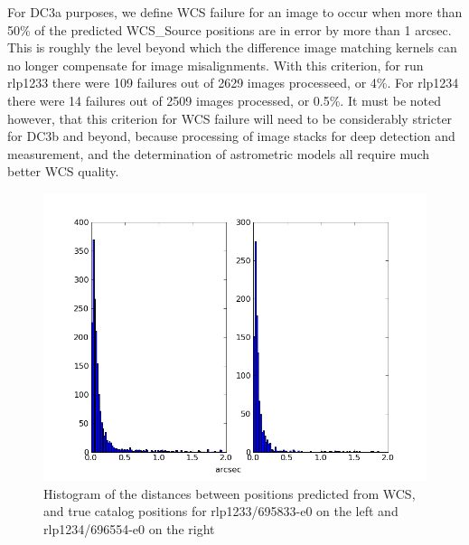For DC3a purposes, we define WCS failure for an image to occur when
more than 50\% of the predicted WCS\_Source positions are in error by
more than 1 arcsec.  This is roughly the level beyond which the difference
image matching kernels can no longer compensate for image misalignments. With
this criterion, for run rlp1233 there were 109 failures out of 2629
images processeed, or 4\%.   For rlp1234 there were 14 failures out
of 2509 images processed, or 0.5\%.  It must be noted however, that this criterion for WCS failure will
need to be considerably stricter for DC3b and beyond, because
processing of image stacks for deep detection and measurement, and the
determination of astrometric models all require much better WCS quality.
\begin{figure}[hb]
\begin{center}
\includegraphics{images/rlp1233_1234_match.png}
\caption{Histogram of the distances between positions predicted from WCS, and
  true catalog positions for rlp1233/695833-e0 on the left and
  rlp1234/696554-e0 on the right}  
\label{fig:wcs1}
\end{center}
\end{figure}

